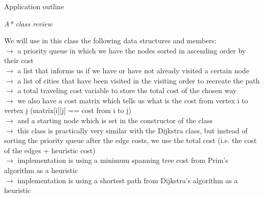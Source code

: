 \documentclass[12pt, a4paper]{article}
\begin{document}
\newpage
\vspace{10mm}
\centering
\Large 
Application outline

\vspace{10mm}
\centering
\large
\textit{A* class review}

\vspace{10mm}
\centering
\large

\begin{flushleft}
\hspace{5mm}
We will use in this class the following data structures and members: \\
\vspace{10mm}
\hspace{3mm}$\rightarrow$ a priority queue in which we have the nodes sorted in ascending order by their cost\\
\hspace{3mm}$\rightarrow$ a list that informs us if we have or have not already visited a certain node\\
\hspace{3mm}$\rightarrow$ a list of cities that have been visited in the visiting order to recreate the path\\
\hspace{3mm}$\rightarrow$ a total traveling cost variable to store the total cost of the chosen way\\
\hspace{3mm}$\rightarrow$ we also have a cost matrix which tells us what is the cost from vertex i to vertex j (matrix[i][j] == cost from i to j)\\
\hspace{3mm}$\rightarrow$ and a starting node which is set in the constructor of the class\\
\hspace{3mm}$\rightarrow$ this class is practically very similar with the Dijkstra class, but instead of sorting the priority queue after the edge costs, we use the total cost (i.e. the cost of the edges + heuristic cost)\\
\hspace{3mm}$\rightarrow$ implementation is using a minimum spanning tree cost from Prim's algorithm as a heuristic\\
\hspace{3mm}$\rightarrow$ implementation is using a shortest path from Dijkstra's algorithm as a heuristic\\
\end{flushleft}
\end{document}
